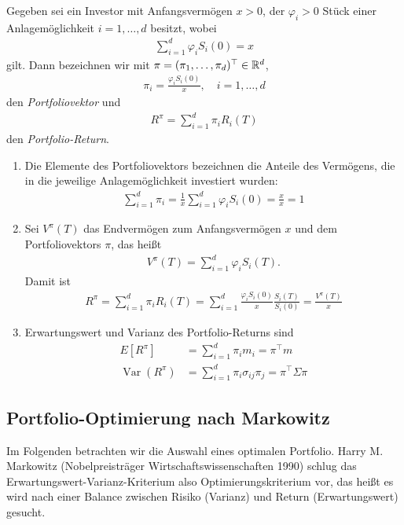 \documentclass[a4paper,twoside,DIV15,BCOR12mm]{scrbook}
\DeclareMathOperator{\Var}{Var}
\begin{document}
\begin{definition}
Gegeben sei ein Investor mit Anfangsvermögen $x>0$, der $\varphi_i>0$ Stück einer Anlagemöglichkeit $i=1,\ldots,d$ besitzt, wobei 
\begin{align*}
\sum_{i=1}^d \varphi_i S_i(0)= x \tag{Budgetgleichung}
\end{align*}
gilt. Dann bezeichnen wir mit $\pi=(\pi_1,\ldots,\pi_d)^\top\in\mathbb{R}^d$,
\begin{align*}
\pi_i = \frac{\varphi_iS_i(0)}x,\quad i=1,\dots,d
\end{align*}
den \emph{Portfoliovektor} und
\begin{align*}
R^\pi = \sum_{i=1}^d \pi_iR_i(T)
\end{align*}
den \emph{Portfolio-Return}.
\end{definition}

\begin{bemerkung}
\begin{enumerate}
\item Die Elemente des Portfoliovektors bezeichnen die Anteile des Vermögens, die in die jeweilige Anlagemöglichkeit investiert wurden:
\begin{align*}
\sum_{i=1}^d \pi_i = \frac1x \sum_{i=1}^d \varphi_iS_i(0) = \frac xx = 1
\end{align*}
\item Sei $V^\pi(T)$ das Endvermögen zum Anfangsvermögen $x$ und dem Portfoliovektors $\pi$, das heißt
\begin{align*}
V^\pi(T) = \sum_{i=1}^d\varphi_iS_i(T).
\end{align*}
Damit ist
\begin{align*}
R^\pi = \sum_{i=1}^d \pi_iR_i(T) = \sum_{i=1}^d \frac{\varphi_iS_i(0)}x \frac{S_i(T)}{S_i(0)} = \frac{V^\pi(T)}x
\end{align*}
\item Erwartungswert und Varianz des Portfolio-Returns sind 
\begin{align*}
E[R^\pi] &= \sum_{i=1}^d \pi_im_i = \pi^\top m \\
\Var(R^\pi) &= \sum_{i=1}^d \pi_i\sigma_{ij}\pi_j = \pi^\top \Sigma \pi
\end{align*}
\end{enumerate}
\end{bemerkung}

\subsection{Portfolio-Optimierung nach Markowitz}
Im Folgenden betrachten wir die Auswahl eines optimalen Portfolio. Harry M. Markowitz (Nobelpreisträger Wirtschaftswissenschaften 1990) schlug das Erwartungswert-Varianz-Kriterium also Optimierungskriterium vor, das heißt es wird nach einer Balance zwischen Risiko (Varianz) und Return (Erwartungswert) gesucht.
\end{document}
